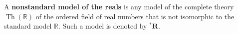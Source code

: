 A \textbf{nonstandard model of the reals} is any model of the complete theory $\operatorname{Th}(\mathbb{R})$ of the ordered field of real numbers that is not isomorphic to the standard model $\mathbb{R}$. Such a model is denoted by ${^*\mathbf{R}}$.
